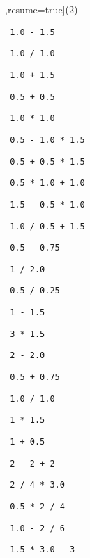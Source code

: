 \begin{exercise}
 

\begin{sltasks}[counter-format=1.tsk[1],resume=true](2)
    \task
    \begin{items}
      \item \texttt{ 1.0 - 1.5 }
      \item \texttt{ 1.0 / 1.0 }
      \item \texttt{ 1.0 + 1.5 }
      \item \texttt{ 0.5 + 0.5 }
      \item \texttt{ 1.0 * 1.0 }
    \end{items}
    \task
    \begin{items}
      \item \texttt{ 0.5 - 1.0 * 1.5 }
      \item \texttt{ 0.5 + 0.5 * 1.5 }
      \item \texttt{ 0.5 * 1.0 + 1.0 }
      \item \texttt{ 1.5 - 0.5 * 1.0 }
      \item \texttt{ 1.0 / 0.5 + 1.5 }
    \end{items}
    \task
    \begin{items}
      \item \texttt{ 0.5 - 0.75 }
      \item \texttt{ 1 / 2.0 }
      \item \texttt{ 0.5 / 0.25 }
      \item \texttt{ 1 - 1.5 }
      \item \texttt{ 3 * 1.5 }
    \end{items}
    \task
    \begin{items}
      \item \texttt{ 2 - 2.0 }
      \item \texttt{ 0.5 + 0.75 }
      \item \texttt{ 1.0 / 1.0 }
      \item \texttt{ 1 * 1.5 }
      \item \texttt{ 1 + 0.5 }
    \end{items}
    \task
    \begin{items}
      \item \texttt{ 2 - 2 + 2 }
      \item \texttt{ 2 / 4 * 3.0 }
      \item \texttt{ 0.5 * 2 / 4 }
      \item \texttt{ 1.0 - 2 / 6 }
      \item \texttt{ 1.5 * 3.0 - 3 }

\end{items}
\end{sltasks}
\end{exercise}
